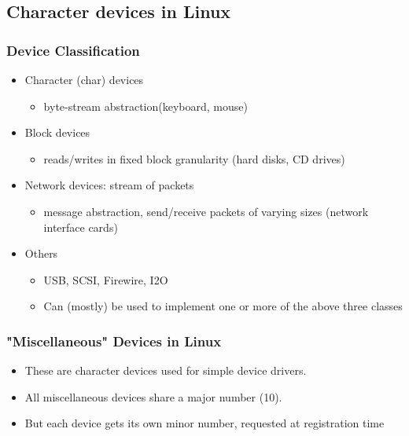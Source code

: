 \documentclass[12pt]{article}
\begin{document}
\subsection{Character devices in Linux}
\subsubsection{Device Classification}
\begin{itemize}
    \item Character (char) devices \begin{itemize}
        \item byte-stream abstraction(keyboard, mouse)
    \end{itemize}
    \item Block devices \begin{itemize}
        \item reads/writes in fixed block granularity (hard disks, CD drives)
    \end{itemize}
    \item Network devices: stream of packets \begin{itemize}
        \item message abstraction, send/receive packets of varying sizes (network interface cards)
    \end{itemize}
    \item Others \begin{itemize}
        \item USB, SCSI, Firewire, I2O
        \item Can (mostly) be used to implement one or more of the above three classes
    \end{itemize}
\end{itemize}
\subsubsection{"Miscellaneous" Devices in Linux}
\begin{itemize}
    \item These are character devices used for simple device drivers. 
    \item All miscellaneous devices share a major number (10). 
    \item But each device gets its own minor number, requested at registration time
\end{itemize}
\end{document}
